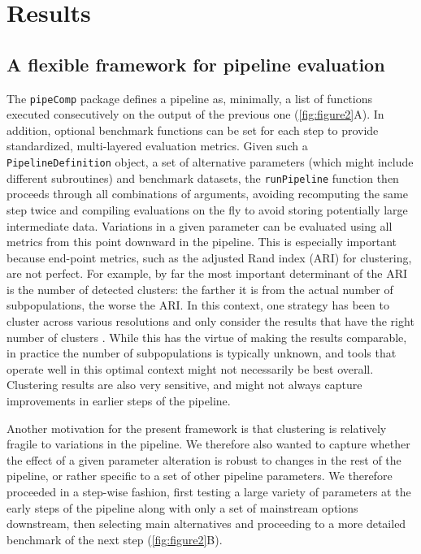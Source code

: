 \documentclass{bmcart}
\begin{document}
\section*{Results}

\subsection*{A flexible framework for pipeline evaluation}

The \texttt{pipeComp} package defines a pipeline as, minimally, a list of functions executed consecutively on the output of the previous one (\ref{fig:figure2}A). In addition, optional benchmark functions can be set for each step to provide standardized, multi-layered evaluation metrics. Given such a \texttt{PipelineDefinition} object, a set of alternative parameters (which might include different subroutines) and benchmark datasets, the \texttt{runPipeline} function then proceeds through all combinations of arguments, avoiding recomputing the same step twice and compiling evaluations on the fly to avoid storing potentially large intermediate data. Variations in a given parameter can be evaluated using all metrics from this point downward in the pipeline. This is especially important because end-point metrics, such as the adjusted Rand index (ARI) for clustering, are not perfect. For example, by far the most important determinant of the ARI is the number of detected clusters: the farther it is from the actual number of subpopulations, the worse the ARI. In this context, one strategy has been to cluster across various resolutions and only consider the results that have the right number of clusters \citep{duoClustering2018}. While this has the virtue of making the results comparable, in practice the number of subpopulations is typically unknown, and tools that operate well in this optimal context might not necessarily be best overall. Clustering results are also very sensitive, and might not always capture improvements in earlier steps of the pipeline.

Another motivation for the present framework is that clustering is relatively fragile to variations in the pipeline. We therefore also wanted to capture whether the effect of a given parameter alteration is robust to changes in the rest of the pipeline, or rather specific to a set of other pipeline parameters. We therefore proceeded in a step-wise fashion, first testing a large variety of parameters at the early steps of the pipeline along with only a set of mainstream options downstream, then selecting main alternatives and proceeding to a more detailed benchmark of the next step (\ref{fig:figure2}B).
\end{document}
